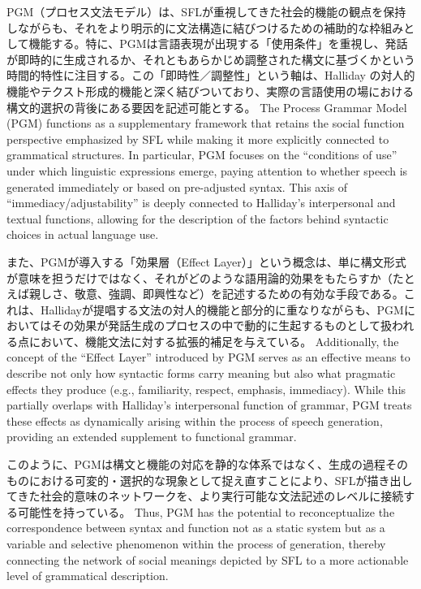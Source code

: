 \ifJPN
PGM（プロセス文法モデル）は、SFLが重視してきた社会的機能の観点を保持しながらも、それをより明示的に文法構造に結びつけるための補助的な枠組みとして機能する。特に、PGMは言語表現が出現する「使用条件」を重視し、発話が即時的に生成されるか、それともあらかじめ調整された構文に基づくかという時間的特性に注目する。この「即時性／調整性」という軸は、Halliday の対人的機能やテクスト形成的機能と深く結びついており、実際の言語使用の場における構文的選択の背後にある要因を記述可能とする。
\else
The Process Grammar Model (PGM) functions as a supplementary framework that retains the social function perspective emphasized by SFL while making it more explicitly connected to grammatical structures. In particular, PGM focuses on the ``conditions of use'' under which linguistic expressions emerge, paying attention to whether speech is generated immediately or based on pre-adjusted syntax. This axis of ``immediacy/adjustability'' is deeply connected to Halliday's interpersonal and textual functions, allowing for the description of the factors behind syntactic choices in actual language use.
\fi

\ifJPN
また、PGMが導入する「効果層（Effect Layer）」という概念は、単に構文形式が意味を担うだけではなく、それがどのような語用論的効果をもたらすか（たとえば親しさ、敬意、強調、即興性など）を記述するための有効な手段である。これは、Hallidayが提唱する文法の対人的機能と部分的に重なりながらも、PGMにおいてはその効果が発話生成のプロセスの中で動的に生起するものとして扱われる点において、機能文法に対する拡張的補足を与えている。
\else
Additionally, the concept of the ``Effect Layer'' introduced by PGM serves as an effective means to describe not only how syntactic forms carry meaning but also what pragmatic effects they produce (e.g., familiarity, respect, emphasis, immediacy). While this partially overlaps with Halliday's interpersonal function of grammar, PGM treats these effects as dynamically arising within the process of speech generation, providing an extended supplement to functional grammar.
\fi

\ifJPN
このように、PGMは構文と機能の対応を静的な体系ではなく、生成の過程そのものにおける可変的・選択的な現象として捉え直すことにより、SFLが描き出してきた社会的意味のネットワークを、より実行可能な文法記述のレベルに接続する可能性を持っている。
\else
Thus, PGM has the potential to reconceptualize the correspondence between syntax and function not as a static system but as a variable and selective phenomenon within the process of generation, thereby connecting the network of social meanings depicted by SFL to a more actionable level of grammatical description.
\fi


